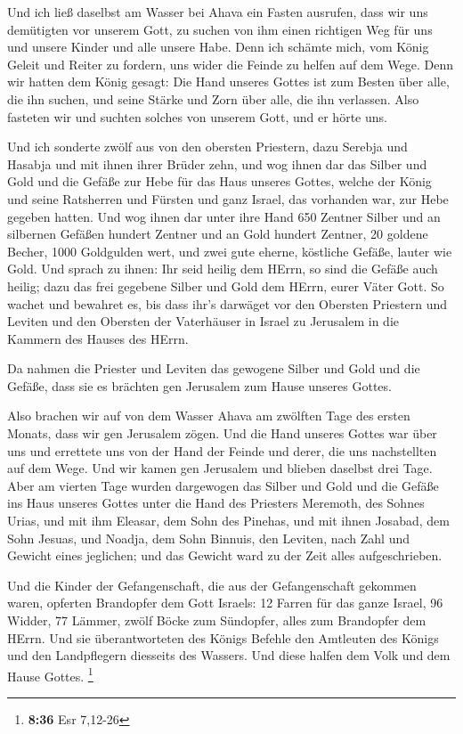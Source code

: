  Und ich ließ daselbst am Wasser bei Ahava ein Fasten
ausrufen, dass wir uns demütigten vor unserem Gott, zu suchen von ihm
einen richtigen Weg für uns und unsere Kinder und alle unsere Habe.
 Denn ich schämte mich, vom König Geleit und Reiter zu
fordern, uns wider die Feinde zu helfen auf dem Wege. Denn wir hatten
dem König gesagt: Die Hand unseres Gottes ist zum Besten über alle, die
ihn suchen, und seine Stärke und Zorn über alle, die ihn verlassen.
 Also fasteten wir und suchten solches von unserem Gott,
und er hörte uns.

 Und ich sonderte zwölf aus von den obersten Priestern,
dazu Serebja und Hasabja und mit ihnen ihrer Brüder zehn, 
und wog ihnen dar das Silber und Gold und die Gefäße zur Hebe für das
Haus unseres Gottes, welche der König und seine Ratsherren und Fürsten
und ganz Israel, das vorhanden war, zur Hebe gegeben hatten.
 Und wog ihnen dar unter ihre Hand 650 Zentner Silber und
an silbernen Gefäßen hundert Zentner und an Gold hundert Zentner,
 20 goldene Becher, 1000 Goldgulden wert, und zwei gute
eherne, köstliche Gefäße, lauter wie Gold.  Und sprach zu
ihnen: Ihr seid heilig dem HErrn, so sind die Gefäße auch heilig; dazu
das frei gegebene Silber und Gold dem HErrn, eurer Väter Gott.
 So wachet und bewahret es, bis dass ihr's darwäget vor den
Obersten Priestern und Leviten und den Obersten der Vaterhäuser in
Israel zu Jerusalem in die Kammern des Hauses des HErrn.

 Da nahmen die Priester und Leviten das gewogene Silber und
Gold und die Gefäße, dass sie es brächten gen Jerusalem zum Hause
unseres Gottes.

 Also brachen wir auf von dem Wasser Ahava am zwölften Tage
des ersten Monats, dass wir gen Jerusalem zögen. Und die Hand unseres
Gottes war über uns und errettete uns von der Hand der Feinde und derer,
die uns nachstellten auf dem Wege.  Und wir kamen gen
Jerusalem und blieben daselbst drei Tage.  Aber am vierten
Tage wurden dargewogen das Silber und Gold und die Gefäße ins Haus
unseres Gottes unter die Hand des Priesters Meremoth, des Sohnes Urias,
und mit ihm Eleasar, dem Sohn des Pinehas, und mit ihnen Josabad, dem
Sohn Jesuas, und Noadja, dem Sohn Binnuis, den Leviten, 
nach Zahl und Gewicht eines jeglichen; und das Gewicht ward zu der Zeit
alles aufgeschrieben.

 Und die Kinder der Gefangenschaft, die aus der
Gefangenschaft gekommen waren, opferten Brandopfer dem Gott Israels: 12
Farren für das ganze Israel, 96 Widder, 77 Lämmer, zwölf Böcke zum
Sündopfer, alles zum Brandopfer dem HErrn.  Und sie
überantworteten des Königs Befehle den Amtleuten des Königs und den
Landpflegern diesseits des Wassers. Und diese halfen dem Volk und dem
Hause Gottes. \footnote{\textbf{8:36} Esr 7,12-26}

